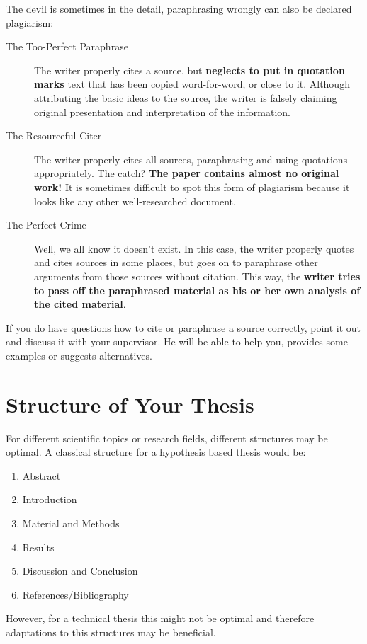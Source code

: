 The devil is sometimes in the detail, paraphrasing wrongly can also be declared plagiarism:
\begin{description}
	\item[The Too-Perfect Paraphrase] The writer properly cites a source, but \textbf{neglects to put in quotation marks} text that has been copied word-for-word, or close to it. Although attributing the basic ideas to the source, the writer is falsely claiming original presentation and interpretation of the information.
	\item[The Resourceful Citer] The writer properly cites all sources, paraphrasing and using quotations appropriately. The catch? \textbf{The paper contains almost no original work!} It is sometimes difficult to spot this form of plagiarism because it looks like any other well-researched document.
	\item[The Perfect Crime] Well, we all know it doesn't exist. In this case, the writer properly quotes and cites sources in some places, but goes on to paraphrase other arguments from those sources without citation. This way, the \textbf{writer tries to pass off the paraphrased material as his or her own analysis of the cited material}.
\end{description}

If you do have questions how to cite or paraphrase a source correctly, point it out and discuss it with your supervisor.
He will be able to help you, provides some examples or suggests alternatives.



\section{Structure of Your Thesis}

For different scientific topics or research fields, different structures may be optimal.
A classical structure for a hypothesis based thesis would be:
\begin{enumerate}
	\item Abstract
	\item Introduction
	\item Material and Methods
	\item Results
	\item Discussion and Conclusion
	\item References/Bibliography
\end{enumerate} 
However, for a technical thesis this might not be optimal and therefore adaptations to this structures may be beneficial.

